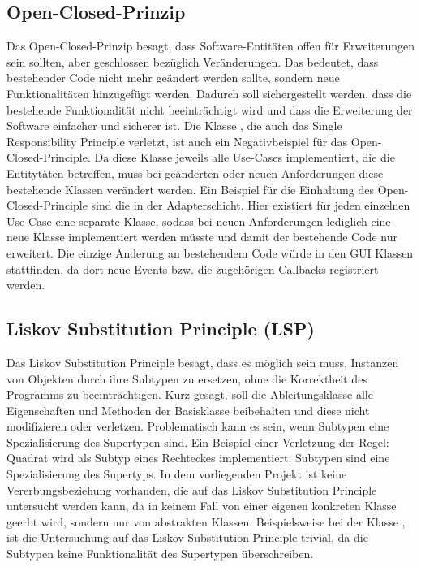 \subsection{Open-Closed-Prinzip}
Das Open-Closed-Prinzip besagt, dass Software-Entitäten offen für Erweiterungen sein sollten, aber geschlossen bezüglich Veränderungen. Das bedeutet, dass bestehender Code nicht mehr geändert werden sollte, sondern neue Funktionalitäten hinzugefügt werden. Dadurch soll sichergestellt werden, dass die bestehende Funktionalität nicht beeinträchtigt wird und dass die Erweiterung der Software einfacher und sicherer ist. Die Klasse , die auch das Single Responsibility Principle verletzt, ist auch ein Negativbeispiel für das Open-Closed-Principle. Da diese Klasse jeweils alle Use-Cases implementiert, die die Entitytäten betreffen, muss bei geänderten oder neuen Anforderungen diese bestehende Klassen verändert werden.
Ein Beispiel für die Einhaltung des Open-Closed-Principle sind die \href{https://github.com/MichaelaHaag/RezeptApp/blob/main/1-Adapter/src/main/java/de/rezeptapp/adapter/GUIFunktionen}{} in der Adapterschicht.
Hier existiert für jeden einzelnen Use-Case eine separate Klasse, sodass bei neuen Anforderungen lediglich eine neue Klasse implementiert werden müsste und damit der bestehende Code nur erweitert. Die einzige Änderung an bestehendem Code würde in den GUI Klassen stattfinden, da dort neue Events bzw. die zugehörigen Callbacks registriert werden.

\subsection{Liskov Substitution Principle (LSP)}
Das Liskov Substitution Principle besagt, dass es möglich sein muss, Instanzen von Objekten durch ihre Subtypen zu ersetzen, ohne die Korrektheit des Programms zu beeinträchtigen. Kurz gesagt, soll die Ableitungsklasse alle Eigenschaften und Methoden der Basisklasse beibehalten und diese nicht modifizieren oder verletzen. Problematisch kann es sein, wenn Subtypen eine Spezialisierung des Supertypen sind. Ein Beispiel einer Verletzung der Regel: Quadrat wird als Subtyp eines Rechteckes implementiert. Subtypen sind eine Spezialisierung des Supertyps.
In dem vorliegenden Projekt ist keine Vererbungsbeziehung vorhanden, die auf das Liskov Substitution Principle untersucht werden kann, da in keinem Fall von einer eigenen konkreten Klasse geerbt wird, sondern nur von abstrakten Klassen. Beispielsweise bei der Klasse \href{https://github.com/MichaelaHaag/RezeptApp/blob/main/0-Plugins/src/main/java/de/rezeptapp/plugins/gui/Startseite.java}{}, ist die Untersuchung auf das Liskov Substitution Principle trivial, da die Subtypen keine Funktionalität des Supertypen überschreiben.

